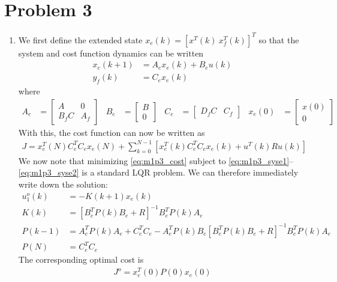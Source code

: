 \section*{Problem 3}

\begin{enumerate}
\item
We first define the extended state $x_e(k) = [x^T(k) \ x_f^T(k)]^T$ so that the system and cost function dynamics can be written
\begin{align}
    x_e(k+1) & = A_e x_e(k) + B_e u(k) 
        \label{eq:m1p3_syse1} \\
    y_f(k) & = C_e x_e(k)
        \label{eq:m1p3_syse2}
\end{align}
where
\begin{align*}
    A_e & = \begin{bmatrix}
            A & 0 \\
            B_f C & A_f
        \end{bmatrix}
        & B_e & = \begin{bmatrix}
            B \\
            0
        \end{bmatrix}
        & C_e & = \begin{bmatrix}
            D_f C & C_f 
        \end{bmatrix}
        & x_e(0) & = \begin{bmatrix}
            x(0) \\
            0
        \end{bmatrix}
\end{align*}
With this, the cost function can now be written as
\begin{align}
    J = x_e^T(N) C_e^T C_e x_e(N) + \sum_{k=0}^{N-1} \left[ x_e^T(k) C_e^T C_e x_e(k) + u^T(k) R u(k) \right]
        \label{eq:m1p3_cost}
\end{align}
We now note that minimizing \eqref{eq:m1p3_cost} subject to \eqref{eq:m1p3_syse1}--\eqref{eq:m1p3_syse2} is a standard LQR problem. We can therefore immediately write down the solution:
\begin{align*}
    u_1^o(k) & = -K(k+1) x_e(k) \\
    K(k) & = [B_e^T P(k) B_e + R]^{-1} B_e^T P(k) A_e \\
    P(k-1) & = A_e^T P(k) A_e + C_e^T C_e - A_e^T P(k) B_e [ B_e^T P(k) B_e + R]^{-1} B_e^T P(k) A_e \\
    P(N) & = C_e^T C_e
\end{align*}
The corresponding optimal cost is
\begin{align*}
    J^o = x_e^T(0) P(0) x_e(0)
\end{align*}




\end{enumerate}
